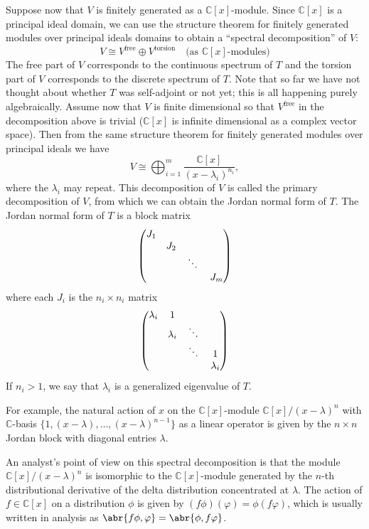 \documentclass[11pt,leqno]{article}
\theoremstyle{plain}
\theoremstyle{definition}
\numberwithin{equation}{section}
\numberwithin{lem}{section}
\begin{document}
Suppose now that $V$ is finitely generated as a $\mathbb C[x]$-module. Since $\mathbb C[x]$ is a principal ideal domain, we can use the structure theorem for finitely generated modules over principal ideals domains to obtain a ``spectral decomposition'' of $V$:
\[V\cong V^{\textrm{free}}\oplus V^{\textrm{torsion}} \quad \text{(as $\mathbb C[x]$-modules)}\]
The free part of $V$ corresponds to the continuous spectrum of $T$ and the torsion part of $V$ corresponds to the discrete spectrum of $T$. Note that so far we have not thought about whether $T$ was self-adjoint or not yet; this is all happening purely algebraically. Assume now that $V$ is finite dimensional so that $V^{\textrm{free}}$ in the decomposition above is trivial ($\mathbb C[x]$ is infinite dimensional as a complex vector space). Then from the same structure theorem for finitely generated modules over principal ideals we have
\[V \cong \bigoplus_{i=1}^m \frac{\mathbb C[x]}{(x-\lambda_i)^{n_i}},\]
where the $\lambda_i$ may repeat. This decomposition of $V$ is called the primary decomposition of $V$, from which we can obtain the Jordan normal form of $T$. The Jordan normal form of $T$ is a block matrix
\[\begin{pmatrix}
	J_1 & & &  \\
	& J_2 & &  \\
	& & \mathbin{\rotatebox[origin=c]{-10}{$\ddots$}} &  \\
	& & & J_m
\end{pmatrix}\]
where each $J_i$ is the $n_i\times n_i$ matrix
\[\begin{pmatrix}
	\lambda_i & 1 \\
	& \lambda_i & \mathbin{\rotatebox[origin=c]{-10}{$\ddots$}}\\
	& & \mathbin{\rotatebox[origin=c]{-10}{$\ddots$}} & 1 \\
	& & & \lambda_i
\end{pmatrix}\]
If $n_i>1$, we say that $\lambda_i$ is a generalized eigenvalue of $T$.

For example, the natural action of $x$ on the $\mathbb C[x]$-module $\mathbb C[x]/(x-\lambda)^n$ with $\mathbb C$-basis $\{1, (x-\lambda),\dots, (x-\lambda)^{n-1}\}$ as a linear operator is given by the $n\times n$ Jordan block with diagonal entries $\lambda$.

An analyst's point of view on this spectral decomposition is that the module $\mathbb C[x]/(x-\lambda)^n$ is isomorphic to the $\mathbb C[x]$-module generated by the $n$-th distributional derivative of the delta distribution concentrated at $\lambda$. The action of $f\in \mathbb C[x]$ on a distribution $\phi$ is given by $(f\phi)(\varphi) = \phi(f\varphi)$, which is usually written in analysis as $\abr{f\phi,\varphi} = \abr{\phi,f\varphi}$.
\end{document}
